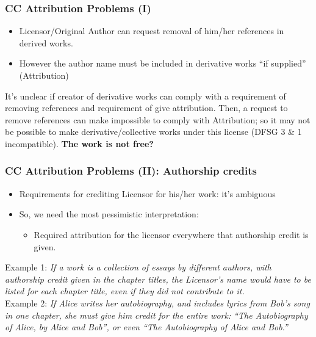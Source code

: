 \begin{frame}
\frametitle{CC Attribution Problems (I)}

\begin{itemize}
\item Licensor/Original Author can request removal of him/her references in derived works.
\item However the author name must be included in derivative works ``if supplied'' (Attribution)
\end{itemize}

It's unclear if creator of derivative works can comply with a requirement of removing references and requirement of give attribution. Then, a request to remove references can make impossible to comply with Attribution; so it may not be possible to make derivative/collective works under this license (DFSG 3 \& 1 incompatible). {\bf The work is not free?}

\end{frame}


\begin{frame}
\frametitle{CC Attribution Problems (II): Authorship credits}

\begin{itemize}
\item Requirements for crediting Licensor for his/her work: it's ambiguous
\item So, we need the most pessimistic interpretation:
\begin{itemize}
\item Required attribution for the licensor everywhere that authorship credit is given.
\end{itemize}
\end{itemize}
Example 1: {\it If a work is a collection of essays by different authors, with authorship credit given in the chapter titles, the Licensor's name would have to be listed for each chapter title, even if they did not contribute to it.}\\
Example 2: {\it If Alice writes her autobiography, and includes lyrics from Bob's song in one chapter, she must give him credit for the entire work: ``The Autobiography of Alice, by Alice and Bob'', or even ``The Autobiography of Alice and Bob.''}
\end{frame}


